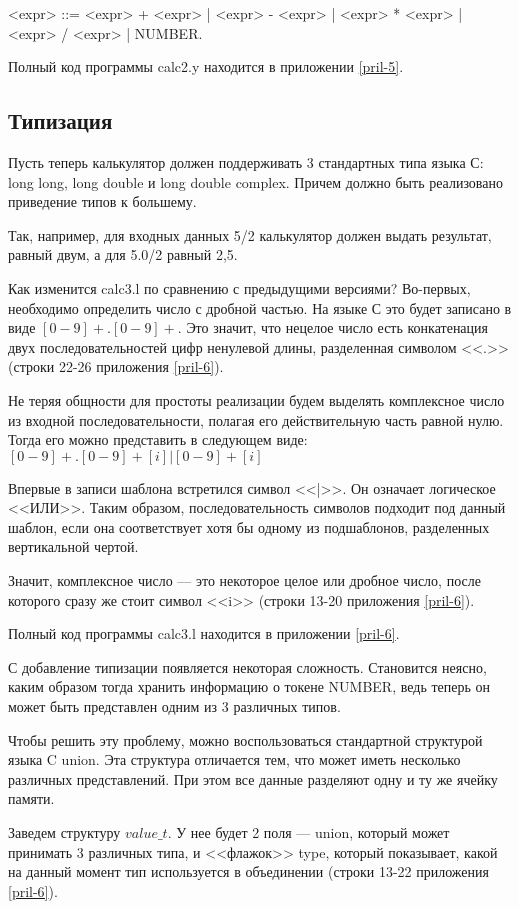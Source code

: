 \documentclass[bachelor, och, coursework, times]{SCWorks}
\begin{document}
<expr> ::= <expr> + <expr> | <expr> - <expr> | <expr> * <expr> | <expr> / <expr> | NUMBER.

Полный код программы calc2.y находится в приложении \ref{pril-5}.

\subsection{Типизация}
Пусть теперь калькулятор должен поддерживать 3 стандартных типа языка С: long long, long double и long double complex. Причем должно быть реализовано приведение типов к большему.

Так, например, для входных данных 5/2 калькулятор должен выдать результат, равный двум, а для 5.0/2 равный 2,5.

Как изменится calc3.l по сравнению с предыдущими версиями?
Во-первых, необходимо определить число с дробной частью. На языке С это будет записано в виде $[0-9]+.[0-9]+$. Это значит, что нецелое число есть конкатенация двух последовательностей цифр ненулевой длины, разделенная символом <<.>>(строки 22-26 приложения \ref{pril-6}).

Не теряя общности для простоты реализации будем выделять комплексное число из входной последовательности, полагая его действительную часть равной нулю.
Тогда его можно представить в следующем виде: \linebreak
$[0-9]+.[0-9]+[i] | [0-9]+[i]$

Впервые в записи шаблона встретился символ <<|>>. Он означает логическое <<ИЛИ>>. Таким образом, последовательность символов подходит под данный шаблон, если она соответствует хотя бы одному из подшаблонов, разделенных вертикальной чертой.

Значит, комплексное число --- это некоторое целое или дробное число, после которого сразу же стоит символ <<i>> (строки 13-20 приложения  \ref{pril-6}).

Полный код программы calc3.l находится в приложении \ref{pril-6}.

С добавление типизации появляется некоторая сложность. Становится неясно, каким образом тогда хранить информацию о токене NUMBER, ведь теперь он может быть представлен одним из 3 различных типов.

Чтобы решить эту проблему, можно воспользоваться стандартной структурой языка C union. Эта структура отличается тем, что может иметь несколько различных представлений. При этом все данные разделяют одну и ту же ячейку памяти. ~\cite{kernigan}

Заведем структуру $value\_t$. У нее будет 2 поля --- union, который может принимать 3 различных типа, и <<флажок>> type, который показывает, какой на данный момент тип используется в объединении (строки 13-22 приложения \ref{pril-6}).
\end{document}
